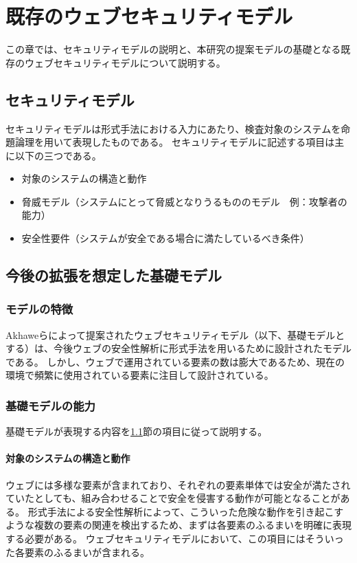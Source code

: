 \documentclass[12pt,a4paper]{jbook}
\begin{document}
\chapter{既存のウェブセキュリティモデル}
この章では、セキュリティモデルの説明と、本研究の提案モデルの基礎となる既存のウェブセキュリティモデルについて説明する。

\section{セキュリティモデル}
\label{sec:SecurityModel}
セキュリティモデルは形式手法における入力にあたり、検査対象のシステムを命題論理を用いて表現したものである。
セキュリティモデルに記述する項目は主に以下の三つである。
\begin{itemize}
\item 対象のシステムの構造と動作
\item 脅威モデル（システムにとって脅威となりうるもののモデル　例：攻撃者の能力）
\item 安全性要件（システムが安全である場合に満たしているべき条件）
\end{itemize}

\section{今後の拡張を想定した基礎モデル}
\label{sec:based-model}

\subsection{モデルの特徴}
\label{sec:based-model-abstract}
Akhaweらによって提案されたウェブセキュリティモデル\cite{based-model}（以下、基礎モデルとする）は、今後ウェブの安全性解析に形式手法を用いるために設計されたモデルである。
しかし、ウェブで運用されている要素の数は膨大であるため、現在の環境で頻繁に使用されている要素に注目して設計されている。

\subsection{基礎モデルの能力}
\label{sec:based-model-power}
基礎モデルが表現する内容を\ref{sec:SecurityModel}節の項目に従って説明する。

\subsubsection{対象のシステムの構造と動作}
ウェブには多様な要素が含まれており、それぞれの要素単体では安全が満たされていたとしても、組み合わせることで安全を侵害する動作が可能となることがある。
形式手法による安全性解析によって、こういった危険な動作を引き起こすような複数の要素の関連を検出するため、まずは各要素のふるまいを明確に表現する必要がある。
ウェブセキュリティモデルにおいて、この項目にはそういった各要素のふるまいが含まれる。
\end{document}
